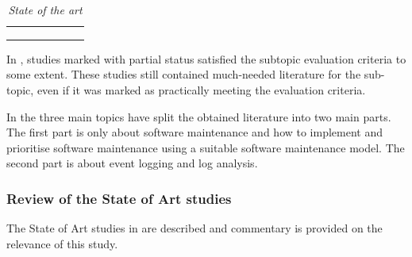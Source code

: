 \begin{table}[!htb]
	\centering
	\caption[State of the art]
	{\textit{State of the art}}
	\label{tbl:ch1_stateOfTheArt2}
	\begin{tabularx}{\textwidth}{cYYYYYY}
		\toprule
		 &  &  &  \\ 
		 \cmidrule(lr){2-4} \cmidrule(lr){5-6} \cmidrule(lr){7-7}
		 & \RaggedRight {} & \RaggedRight {} & \RaggedRight {} &  &  & \RaggedRight {} \\ 		
		\midrule
			\sotaCore
		\bottomrule
	\end{tabularx}	
\end{table}

In , studies marked with partial status satisfied the subtopic evaluation criteria to some extent. These studies still contained much-needed literature for the sub-topic, even if it was marked as practically meeting the evaluation criteria.\par In  the three main topics have split the obtained literature into two main parts. The first part is only about software maintenance and how to implement and prioritise software maintenance using a suitable software maintenance model. The second part is about event logging and log analysis. 

\clearpage

\subsubsection{Review of the State of Art studies}
The State of Art studies in  are described and commentary is provided on the relevance of this study.



\newcommand{\problemStatement}{Software maintenance is a problem in the industry due to how inefficiently developers prioritise maintenance activities. A proven method to monitor software behaviours is event logging. The logging mechanism and log analysis to improve software maintenance need to be explicitly designed for user-based events.}

